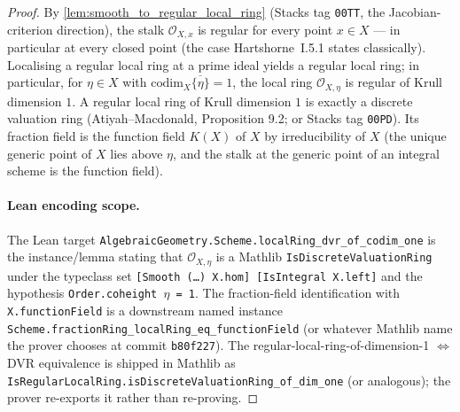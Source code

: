 \begin{proof}

  By \cref{lem:smooth_to_regular_local_ring} (Stacks tag \texttt{00TT}, the
  Jacobian-criterion direction), the stalk \(\mathcal O_{X, x}\) is regular for
  every point \(x \in X\) --- in particular at every closed point (the case
  Hartshorne~I.5.1 states classically). Localising a regular local ring at a
  prime ideal yields a regular local ring; in particular, for \(\eta \in X\) with
  \(\mathrm{codim}_X \overline{\{\eta\}} = 1\), the local ring
  \(\mathcal O_{X, \eta}\) is regular of Krull dimension \(1\). A regular local ring of Krull dimension \(1\) is exactly a
  discrete valuation ring (Atiyah--Macdonald, Proposition 9.2; or Stacks tag
  \texttt{00PD}). Its fraction field is the function field \(K(X)\) of \(X\) by
  irreducibility of \(X\) (the unique generic point of \(X\) lies above \(\eta\), and the
  stalk at the generic point of an integral scheme is the function field).

  \paragraph{Lean encoding scope.} The Lean target
  \texttt{AlgebraicGeometry.Scheme.localRing\_dvr\_of\_codim\_one} is the
  instance/lemma stating that \(\mathcal O_{X, \eta}\) is a Mathlib
  \texttt{IsDiscreteValuationRing} under the typeclass set
  \texttt{[Smooth\,(\dots)\,X.hom]\ [IsIntegral X.left]} and the hypothesis
  \texttt{Order.coheight\ \(\eta\) = 1}. The fraction-field identification with
  \texttt{X.functionField} is a downstream named instance
  \texttt{Scheme.fractionRing\_localRing\_eq\_functionField} (or whatever Mathlib name
  the prover chooses at commit \texttt{b80f227}). The regular-local-ring-of-dimension-1
  \(\Leftrightarrow\) DVR equivalence is shipped in Mathlib as
  \texttt{IsRegularLocalRing.isDiscreteValuationRing\_of\_dim\_one} (or analogous);
  the prover re-exports it rather than re-proving.
\end{proof}

